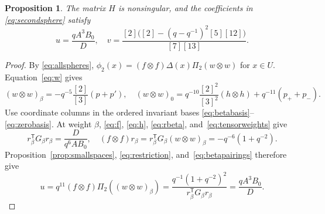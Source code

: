 \documentclass[12pt,reqno]{amsart}
\theoremstyle{plain}
\newtheorem{proposition}[theorem]{Proposition}
\theoremstyle{definition}
\numberwithin{equation}{section}
\newcommand{\tens}{\otimes}
\begin{document}
\begin{proposition}\label{prop:second}
	The matrix $H$ is nonsingular, and the coefficients in
	\eqref{eq:secondsphere} satisfy
	\begin{equation}\label{eq:uclosed}
		u=\frac{qA^3B_0}{D},\quad
		v=\frac{[2]\bigl([2]-(q-q^{-1})^2[5][12]\bigr)}{[7][13]}.
	\end{equation}
\end{proposition}

\begin{proof}
	By \eqref{eq:allspheres},
	$\phi_2(x)=(f\tens f)\Delta(x)\Pi_2(w\tens w)$ for $x\in U$.
	Equation~\eqref{eq:w} gives
	\begin{equation}\label{eq:tensorweights}
			(w\tens w)_\beta
			=-q^{-5}\frac{[2]}{[3]}(p+p'),\quad
			(w\tens w)_0
			=q^{-10}\frac{[2]^2}{[3]^2}(h\tens h)
			+q^{-11}(p_++p_-).
	\end{equation}
	Use coordinate columns in the ordered invariant bases
	\eqref{eq:betabasis}--\eqref{eq:zerobasis}.
	At weight $\beta$, \eqref{eq:f}, \eqref{eq:h},
	\eqref{eq:rbeta}, and~\eqref{eq:tensorweights} give
	\begin{equation}\label{eq:betapairings}
			r_\beta^{\mathsf T}G_\beta r_\beta
			=\frac{D}{q^6AB_0},\quad
			(f\tens f)r_\beta
			=r_\beta^{\mathsf T}G_\beta(w\tens w)_\beta
			=-q^{-6}(1+q^{-2}).
	\end{equation}
	Proposition~\ref{prop:smallspaces}, \eqref{eq:restriction},
	and~\eqref{eq:betapairings} therefore give
	\[
	u=q^{11}(f\tens f)\Pi_2((w\tens w)_\beta)
	=\frac{q^{-1}(1+q^{-2})^2}
	{r_\beta^{\mathsf T}G_\beta r_\beta}
	=\frac{qA^3B_0}{D}.
	\]
	

\end{proof}
\end{document}
